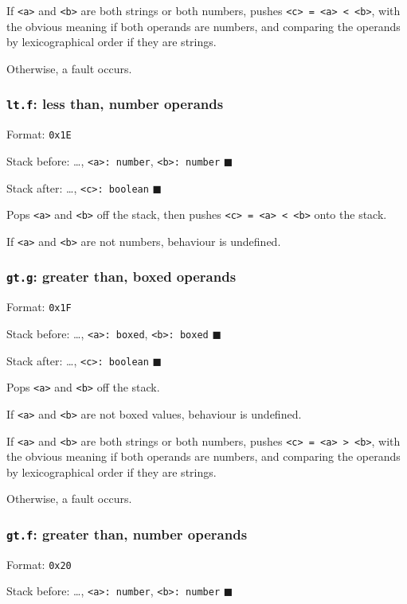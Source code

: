 If \texttt{<a>} and \texttt{<b>} are both strings or both numbers, pushes
\texttt{<c> = <a> < <b>}, with the obvious meaning if both operands are
numbers, and comparing the operands by lexicographical order if they are
strings.

Otherwise, a fault occurs.

\subsubsection{\texttt{lt.f}: less than, number operands}
\label{sec:orga91f7a6}
Format: \texttt{0x1E}

Stack before: \ldots{}, \texttt{<a>: number}, \texttt{<b>: number} \(\blacksquare\)

Stack after: \ldots{}, \texttt{<c>: boolean} \(\blacksquare\)

Pops \texttt{<a>} and \texttt{<b>} off the stack, then pushes \texttt{<c> = <a> < <b>} onto
the stack.

If \texttt{<a>} and \texttt{<b>} are not numbers, behaviour is undefined.

\subsubsection{\texttt{gt.g}: greater than, boxed operands}
\label{sec:orge89bbc6}
Format: \texttt{0x1F}

Stack before: \ldots{}, \texttt{<a>: boxed}, \texttt{<b>: boxed} \(\blacksquare\)

Stack after: \ldots{}, \texttt{<c>: boolean} \(\blacksquare\)

Pops \texttt{<a>} and \texttt{<b>} off the stack.

If \texttt{<a>} and \texttt{<b>} are not boxed values, behaviour is undefined.

If \texttt{<a>} and \texttt{<b>} are both strings or both numbers, pushes
\texttt{<c> = <a> > <b>}, with the obvious meaning if both operands are
numbers, and comparing the operands by lexicographical order if they are
strings.

Otherwise, a fault occurs.

\subsubsection{\texttt{gt.f}: greater than, number operands}
\label{sec:org3ea3931}
Format: \texttt{0x20}

Stack before: \ldots{}, \texttt{<a>: number}, \texttt{<b>: number} \(\blacksquare\)


